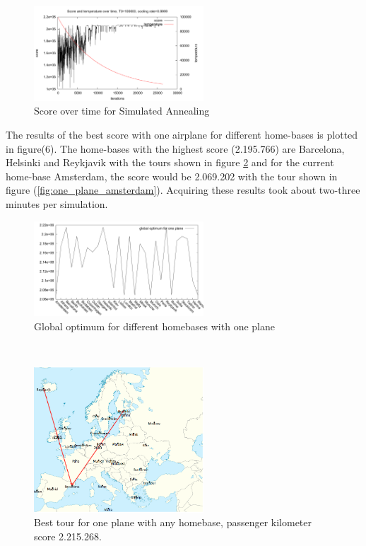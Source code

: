 \documentclass[journal]{IEEEtran}
\begin{document}
\begin{figure}[H]
\centering
\includegraphics[width=2.5in]{score_over_time}
\caption{Score over time for Simulated Annealing}
\label{fig:simulated_annealing_score}
\end{figure}
The results of the best score with one airplane for different home-bases is plotted in figure(6). The home-bases with the highest score (2.195.766) are Barcelona, Helsinki and Reykjavik with the tours shown in figure \ref{fig:different_homebase_one_plane} and for the current home-base Amsterdam, the score would be 2.069.202 with the tour shown in figure (\ref{fig:one_plane_amsterdam}). Acquiring these results took about two-three minutes per simulation.
\\
\begin{figure}[!h]
\centering
\includegraphics[width=2.5in]{different_homebases_one_plane}
\caption{Global optimum for different homebases with one plane}
\label{fig:different_homebase_one_plane}
\end{figure}
\\
\begin{figure}[!h]
\centering
\includegraphics[width=2.5in]{best_tour_one_plane}
\caption{Best tour for one plane with any homebase, passenger kilometer score 2.215.268.}
\label{fig:one_plane}
\end{figure}
\end{document}
